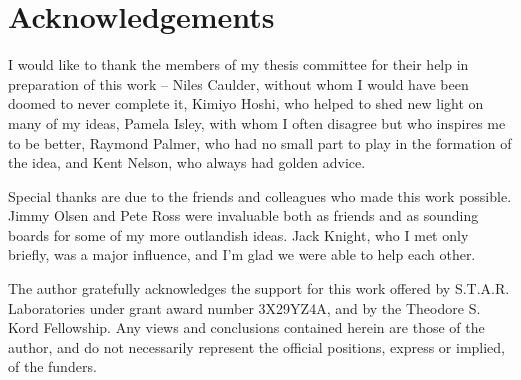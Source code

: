 \chapter*{Acknowledgements}

I would like to thank the members of my thesis committee for their help in preparation of this work – Niles Caulder, without whom I would have been doomed to never complete it, Kimiyo Hoshi, who helped to shed new light on many of my ideas, Pamela Isley, with whom I often disagree but who inspires me to be better, Raymond Palmer, who had no small part to play in the formation of the idea, and Kent Nelson, who always
had golden advice.

Special thanks are due to the friends and colleagues who made this work possible. Jimmy Olsen and Pete Ross were invaluable both as friends and as sounding boards for some of my more outlandish ideas. Jack Knight, who I met only briefly, was a major influence, and I’m glad we were able to help each other.

The author gratefully acknowledges the support for this work offered by S.T.A.R. Laboratories under grant award number 3X29YZ4A, and by the Theodore S. Kord Fellowship. Any views and conclusions contained herein are those of the author, and do not necessarily represent the official positions, express or implied, of the funders.